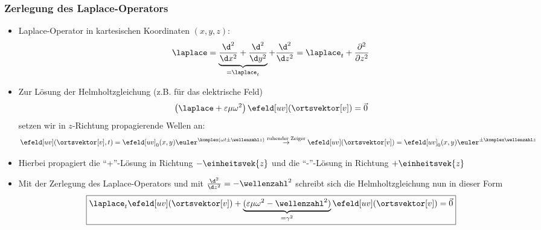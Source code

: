 \begin{frame}
  \frametitle{Zerlegung des Laplace-Operators}
       \begin{itemize}[<+->]
       \item Laplace-Operator in kartesischen Koordinaten \((x,y,z)\):
         \begin{equation*}
           \laplace = \underbrace{\frac{\d^2}{\d x^2}+\frac{\d^2}{\d y^2}}_{=\laplace_t}+\frac{\d^2}{\d z^2} = \laplace_t + \frac{\partial^{2}}{\partial z^{2}}
           \end{equation*}
       \item Zur Lösung der Helmholtzgleichung (z.B. für das elektrische Feld)
         \begin{equation*}
           \left(\laplace + \varepsilon\mu\omega^2\right) \efeld[uv](\ortsvektor[v]) =\vec{0}
         \end{equation*}
         setzen wir \alert{in \(z\)-Richtung propagierende Wellen} an:
         \begin{equation*}
           \efeld[uv](\ortsvektor[v], t) = \efeld[uv]_0(x,y) \euler^{\komplex(\omega t \pm \wellenzahl z)} \stackrel{\text{ruhender Zeiger}}{\to}  \efeld[uv](\ortsvektor[v]) = \efeld[uv]_0(x,y) \euler^{\pm\komplex\wellenzahl z}
         \end{equation*}
       \item Hierbei propagiert die \enquote{+}-Lösung in Richtung \(-\einheitsvek{z}\) und die \enquote{-}-Lösung in Richtung \(+\einheitsvek{z}\)
       \item Mit der Zerlegung des Laplace-Operators und mit \(\frac{\d^2}{\d z^2} = -\wellenzahl^2\) schreibt sich die Helmholtzgleichung nun in dieser Form
         \begin{equation*}
           \boxed{\laplace_t \efeld[uv](\ortsvektor[v]) + \underbrace{(\varepsilon\mu\omega^2 - \wellenzahl^2)}_{=\gamma^2} \efeld[uv](\ortsvektor[v]) =\vec{0}}
           \end{equation*}
       \end{itemize}
\end{frame}

